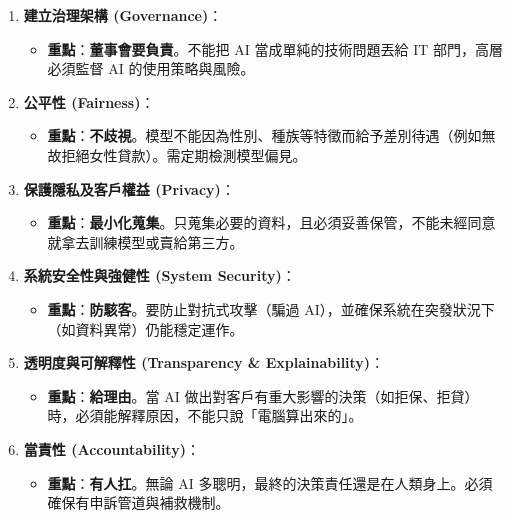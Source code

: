 \documentclass[
  letterpaper,
  DIV=11,
  numbers=noendperiod]{scrreprt}
\providecommand{\tightlist}{%
  \setlength{\itemsep}{0pt}\setlength{\parskip}{0pt}}
\begin{document}
\begin{enumerate}
\def\labelenumi{\arabic{enumi}.}
\tightlist
\item
  \textbf{建立治理架構 (Governance)}：

  \begin{itemize}
  \tightlist
  \item
    \textbf{重點}：\textbf{董事會要負責}。不能把 AI
    當成單純的技術問題丟給 IT 部門，高層必須監督 AI 的使用策略與風險。
  \end{itemize}
\item
  \textbf{公平性 (Fairness)}：

  \begin{itemize}
  \tightlist
  \item
    \textbf{重點}：\textbf{不歧視}。模型不能因為性別、種族等特徵而給予差別待遇（例如無故拒絕女性貸款）。需定期檢測模型偏見。
  \end{itemize}
\item
  \textbf{保護隱私及客戶權益 (Privacy)}：

  \begin{itemize}
  \tightlist
  \item
    \textbf{重點}：\textbf{最小化蒐集}。只蒐集必要的資料，且必須妥善保管，不能未經同意就拿去訓練模型或賣給第三方。
  \end{itemize}
\item
  \textbf{系統安全性與強健性 (System Security)}：

  \begin{itemize}
  \tightlist
  \item
    \textbf{重點}：\textbf{防駭客}。要防止對抗式攻擊（騙過
    AI），並確保系統在突發狀況下（如資料異常）仍能穩定運作。
  \end{itemize}
\item
  \textbf{透明度與可解釋性 (Transparency \& Explainability)}：

  \begin{itemize}
  \tightlist
  \item
    \textbf{重點}：\textbf{給理由}。當 AI
    做出對客戶有重大影響的決策（如拒保、拒貸）時，必須能解釋原因，不能只說「電腦算出來的」。
  \end{itemize}
\item
  \textbf{當責性 (Accountability)}：

  \begin{itemize}
  \tightlist
  \item
    \textbf{重點}：\textbf{有人扛}。無論 AI
    多聰明，最終的決策責任還是在人類身上。必須確保有申訴管道與補救機制。
  \end{itemize}
\end{enumerate}
\end{document}
